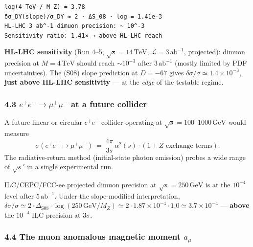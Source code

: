 \documentclass[
  11pt,
  a4paper,
]{article}
\begin{document}
\begin{verbatim}
log(4 TeV / M_Z) = 3.78
δσ_DY(slope)/σ_DY ≈ 2 · ΔS_08 · log = 1.41e-3
HL-LHC 3 ab^-1 dimuon precision: ~ 10^-3
Sensitivity ratio: 1.41× → above HL-LHC reach
\end{verbatim}

\textbf{HL-LHC sensitivity} (Run 4--5, \(\sqrt s = 14\,\mathrm{TeV}\), \(\mathcal L = 3\,\mathrm{ab}^{-1}\), projected): dimuon precision at \(M = 4\,\mathrm{TeV}\) should reach \(\sim 10^{-3}\) after \(3\,\mathrm{ab}^{-1}\) (mostly limited by PDF uncertainties). The (S08) slope prediction at \(D = -67\) gives \(\delta\sigma/\sigma \simeq 1.4 \times 10^{-3}\), \textbf{just above HL-LHC sensitivity} --- at the \emph{edge} of the testable regime.

\hypertarget{e-e--to-mu-mu--at-a-future-collider}{%
\subsubsection{\texorpdfstring{4.3 \(e^+ e^- \to \mu^+ \mu^-\) at a future collider}{4.3 e\^{}+ e\^{}- \textbackslash to \textbackslash mu\^{}+ \textbackslash mu\^{}- at a future collider}}\label{e-e--to-mu-mu--at-a-future-collider}}

A future linear or circular \(e^+ e^-\) collider operating at \(\sqrt s = 100\)--\(1000\,\mathrm{GeV}\) would measure
\[
\sigma(e^+e^- \to \mu^+\mu^-)\ =\ \frac{4\pi}{3 s}\,\alpha^2(s)\cdot (1 + Z\text{-exchange terms}).
\]
The radiative-return method (initial-state photon emission) probes a wide range of \(\sqrt s'\) in a single experimental run.

ILC/CEPC/FCC-ee projected dimuon precision at \(\sqrt s = 250\,\mathrm{GeV}\) is at the \(10^{-4}\) level after \(5\,\mathrm{ab}^{-1}\). Under the slope-modified interpretation, \(\delta\sigma/\sigma \simeq 2 \cdot \Delta_{\mathrm{S08}} \cdot \log(250\,\mathrm{GeV}/M_Z) \simeq 2 \cdot 1.87\times 10^{-4} \cdot 1.0 \simeq 3.7\times 10^{-4}\) --- \textbf{above} the \(10^{-4}\) ILC precision at \(3\sigma\).

\hypertarget{the-muon-anomalous-magnetic-moment-a_mu}{%
\subsubsection{\texorpdfstring{4.4 The muon anomalous magnetic moment \(a_\mu\)}{4.4 The muon anomalous magnetic moment a\_\textbackslash mu}}\label{the-muon-anomalous-magnetic-moment-a_mu}}
\end{document}
